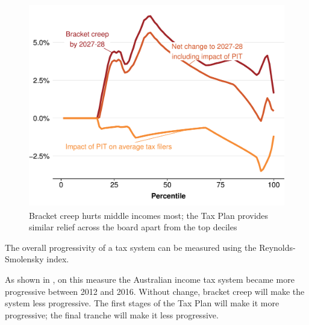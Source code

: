 \documentclass[submission]{grattan}\usepackage[]{graphicx}\usepackage[]{color}
\newenvironment{knitrout}{}{} %
\begin{document}
\begin{figure}
\caption{Bracket creep hurts middle incomes most; the Tax Plan provides similar relief across the board apart from the top deciles}\label{fig:3}
\begin{knitrout}
\color{fgcolor}
\includegraphics[width=4.47222in,height=3.51158068592058in]{atlas/fig3-1} 

\end{knitrout}
\end{figure}

The overall progressivity of a tax system can be measured using the Reynolds-Smolensky index.

As shown in , on this measure the Australian income tax system became more progressive between 2012 and 2016. Without change, bracket creep will make the system less progressive. The first stages of the Tax Plan will make it more progressive; the final tranche will make it less progressive.
\end{document}
